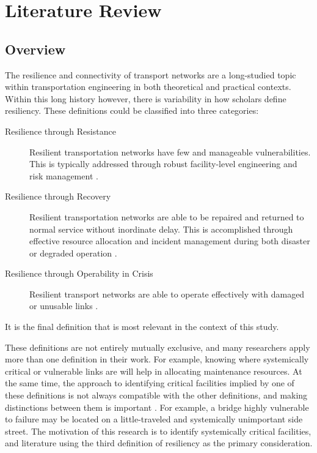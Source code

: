 \chapter{Literature Review}
\label{chp:chapter2}
\graphicspath{{figures/}{figures/chapter2/}}

\section{Overview}
\label{sec:ch2overview}

The resilience and connectivity of transport networks are a long-studied
topic within
transportation engineering in both theoretical and practical contexts.
Within this long history
however, there is variability in how scholars define resiliency. These definitions
could be classified into three categories:
\begin{description}
	\item [Resilience through Resistance]{Resilient transportation networks
	have few and manageable vulnerabilities. This is typically addressed
	through robust facility-level engineering and risk management
	\citep{bradley2007, peeta2010}.}
	\item [Resilience through Recovery] {Resilient transportation networks are
	able to be repaired and returned to normal service without inordinate
	delay. This is accomplished through effective resource allocation and
	incident management during both disaster or degraded operation
	\citep{zhang2016}.}
	\item [Resilience through Operability in Crisis] {Resilient transport
	networks are able to operate effectively with damaged or unusable links
	\citep{berdica2002, ip2011}.}
\end{description}
It is the final definition that is most relevant in the context of this study.

These definitions are not entirely mutually exclusive, and many
researchers apply more than one
definition in their work. For example, knowing where systemically critical
or vulnerable links
are will help in allocating maintenance resources. At the same time, the
approach to identifying
critical facilities implied by one of these definitions is not always
compatible with the other
definitions, and making distinctions between them is important
\citep{rogers2012}. For example, a bridge
highly vulnerable to failure may be located on a little-traveled and
systemically unimportant
side street. The motivation of this research is to identify systemically
critical facilities, and literature using the third definition of resiliency as the primary consideration.

